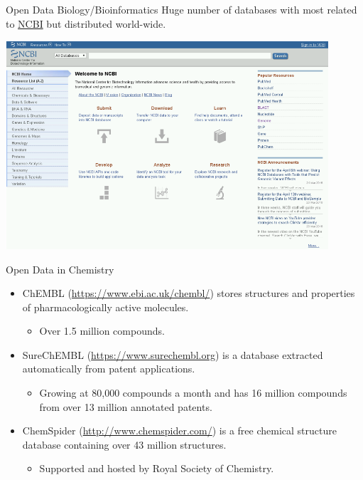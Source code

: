 \documentclass[xcolor=svgnames]{beamer}
\newcommand{\nl}{\\[1em]}
\begin{document}
\begin{frame}{Open Data Biology/Bioinformatics}
Huge number of databases with most related to  \href{http://www.ncbi.nlm.nih.gov/}{NCBI} but distributed world-wide.
\begin{center}
\includegraphics[width=0.9\textwidth]{img/ncbi}
\end{center}

\end{frame}

\begin{frame}{Open Data in Chemistry}
\begin{itemize}
\item ChEMBL (\url{https://www.ebi.ac.uk/chembl/}) stores structures and properties of pharmacologically active molecules.
\begin{itemize}
\item Over 1.5 million compounds.\nl
\end{itemize}


\item  SureChEMBL (\url{https://www.surechembl.org}) is a database extracted automatically from patent applications.
\begin{itemize}
\item  Growing at 80,000 compounds a month and has 16 million compounds from over 13 million annotated patents.\nl
\end{itemize}

\item  ChemSpider (\url{http://www.chemspider.com/}) is a free chemical structure database containing over 43 million structures.
\begin{itemize}
\item  Supported and hosted by Royal Society of Chemistry.
\end{itemize}
\end{itemize}
\end{frame}
\end{document}
